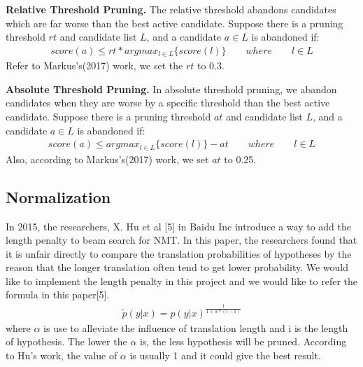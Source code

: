 \documentclass[a4paper]{article}
\begin{document}
\textbf{Relative Threshold Pruning.} The relative threshold abandons candidates which are far worse than the best active candidate. Suppose there is a pruning threshold $rt$ and candidate list $L$, and a candidate $a\in L$ is abandoned if:
\begin{align*}
score(a) \leq rt*argmax_{l \in L}\{score(l)\} \qquad where \qquad  l \in L
\end{align*}
Refer to Markus's(2017) work, we set the $rt$ to 0.3.

\textbf{Absolute Threshold Pruning.} In absolute threshold pruning, we abandon candidates when they are worse by a specific threshold than the best active candidate. Suppose there is a pruning threshold $at$ and candidate list $L$, and a candidate $a\in L$ is abandoned if:
\begin{align*}
score(a) \leq argmax_{l \in L}\{score(l)\}-at \qquad where \qquad  l \in L
\end{align*}
Also, according to Markus's(2017) work, we set $at$ to 0.25.


\subsection{Normalization}
In 2015, the researchers, X. Hu et al [5] in Baidu Inc introduce a way to add the length penalty to beam search for NMT. In this paper, the researchers found that it is unfair directly to compare the translation probabilities of hypotheses by the reason that the longer translation often tend to get lower probability.  We would like to implement the length penalty in this project and we would like to refer the formula in this paper[5].
\begin{align*}
\widetilde p(y|x)=p(y|x)^{\frac{1}{1+\alpha * (i-1)}}
\end{align*}
where $\alpha$ is use to alleviate the influence of translation length and i is the length of hypothesis. The lower the $\alpha$ is, the less hypothesis will be pruned. According to Hu's work, the value of $\alpha$ is usually 1 and it could give the best result.
\end{document}
